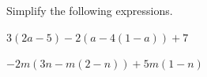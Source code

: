  Simplify the following expressions.

\begin{subparts}
  \item $3(2a-5)-2(a-4(1-a))+7$
  \item $-2m(3n-m(2-n))+5m(1-n)$
\end{subparts}

